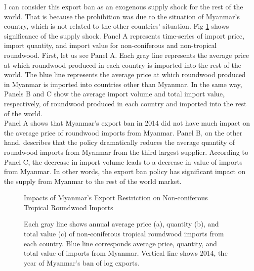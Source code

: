 \documentclass[a4paper,12pt]{article}
\begin{document}
I can consider this export ban as an exogenous supply shock for the rest of the world. That is because the prohibition was due to the situation of Myanmar's country, which is not related to the other countries' situation. Fig \ref{fig:shock_Myanmar} shows significance of the supply shock. Panel A represents time-series of import price, import quantity, and import value for non-coniferous and non-tropical roundwood. First, let us see Panel A. Each gray line represents the average price at which roundwood produced in each country is imported into the rest of the world. The blue line represents the average price at which roundwood produced in Myanmar is imported into countries other than Myanmar. In the same way, Panels B and C show the average import volume and total import value, respectively, of roundwood produced in each country and imported into the rest of the world.\\

Panel A shows that Myanmar's export ban in 2014 did not have much impact on the average price of roundwood imports from Myanmar. Panel B, on the other hand, describes that the policy dramatically reduces the average quantity of roundwood imports from Myanmar from the third largest supplier. According to Panel C, the decrease in import volume leads to a decrease in value of imports from Myanmar. In other words, the export ban policy has significant impact on the supply from Myanmar to the rest of the world market. 

\begin{figure}[H] 
    \centering
    \caption{Impacts of Myanmar's Export Restriction on Non-coniferous Tropical Roundwood Imports}
    \caption*{\small{Each gray line shows annual average price (a), quantity (b), and total value (c) of non-coniferous tropical roundwood imports from each country. Blue line corresponds average price, quantity, and total value of imports from Myanmar. Vertical line shows 2014, the year of Myanmar's ban of log exports.}}
    \label{fig:shock_Myanmar}
\end{figure}
\end{document}
